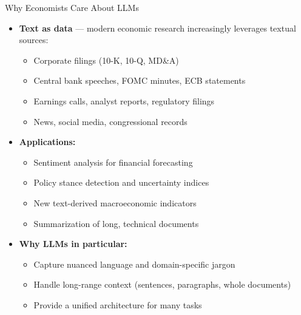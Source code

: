 \begin{frame}{Why Economists Care About LLMs}
\begin{itemize}
\item \textbf{Text as data} --- modern economic research increasingly leverages textual sources:
\begin{itemize}
    \item Corporate filings (10-K, 10-Q, MD\&A)
    \item Central bank speeches, FOMC minutes, ECB statements
    \item Earnings calls, analyst reports, regulatory filings
    \item News, social media, congressional records
\end{itemize}

\medskip
\item \textbf{Applications:}
\begin{itemize}
    \item Sentiment analysis for financial forecasting
    \item Policy stance detection and uncertainty indices
    \item New text-derived macroeconomic indicators
    \item Summarization of long, technical documents
\end{itemize}

\medskip
\item \textbf{Why LLMs in particular:}
\begin{itemize}
    \item Capture nuanced language and domain-specific jargon
    \item Handle long-range context (sentences, paragraphs, whole documents)
    \item Provide a unified architecture for many tasks
\end{itemize}
\end{itemize}
\end{frame}

